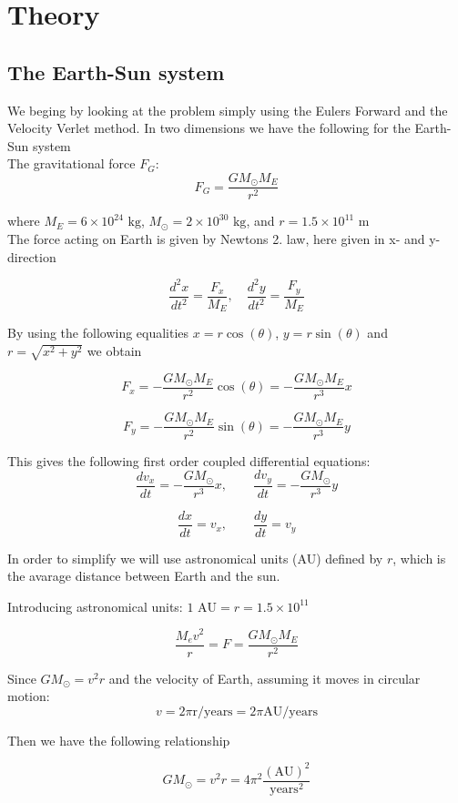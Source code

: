 \documentclass[../main.tex]{subfiles}
\begin{document}
\section{Theory}\label{theory}
\subsection{The Earth-Sun system}
We beging by looking at the problem simply using the Eulers Forward and the Velocity Verlet method.
In two dimensions we have the following for the Earth-Sun system \\

The gravitational force $F_G$:
$$F_G= \frac{GM_{\odot}M_E}{r^2}$$

where $M_E = 6\times 10^{24}\text{ kg}$,  $ M_{\odot} = 2\times 10^{30}\text{ kg}$, and  $r = 1.5\times 10^{11}\text{ m}$\\
The force acting on Earth is given by Newtons 2. law, here given in x- and y- direction

$$ \frac{d^2x}{dt^2} = \frac{F_x}{M_E}, \quad \frac{d^2y}{dt^2} = \frac{F_y}{M_E}$$

By using the following equalities $x = r \cos(\theta)$,  $y = r\sin(\theta)$ and $r = \sqrt{x^2 +y^2}$ we obtain

$$F_x = - \frac{GM_{\odot}M_E}{r^2} \cos(\theta) =- \frac{GM_{\odot}M_E}{r^3}x$$

$$F_y = - \frac{GM_{\odot}M_E}{r^2}\sin(\theta) =- \frac{GM_{\odot}M_E}{r^3}y$$


This gives the following first order  coupled differential equations:
$$ \frac{dv_x}{dt} = - \frac{GM_{\odot}}{r^3}x,\qquad \frac{dv_y}{dt} = - \frac{GM_{\odot}}{r^3}y$$

  $$\frac{dx}{dt} = v_x,\qquad \frac{dy}{dt} = v_y$$

In order to simplify we will use astronomical units (AU) defined by $r$, which is the avarage distance between Earth and the sun.

Introducing astronomical units: $1\text{ AU}= r = 1.5 \times 10^{11}$


$$ \frac{M_ev^2}{r} = F = \frac{GM_{\odot}M_E}{r^2}$$


Since $GM_{\odot} = v^2r$ and the velocity of Earth, assuming it moves in circular motion: $$v = 2\pi \text{r/years}= 2\pi \text{AU/years}$$

Then we have the following relationship

$$GM_{\odot} = v^2r = 4\pi^2 \frac{(\text{AU})^2}{\text{years}^2}$$
\end{document}
